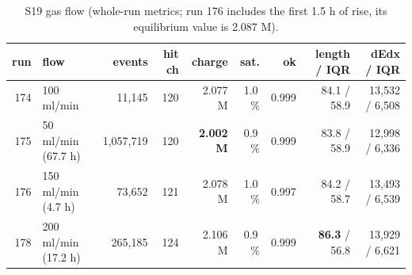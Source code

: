\documentclass[a4paper,11pt]{article}
\begin{document}
\begin{table}[H]\centering\small
\caption{S19 gas flow (whole-run metrics; run 176 includes the first 1.5 h of rise, its equilibrium value is 2.087 M).}
\begin{tabular}{rlrrrrrrr}
\toprule
run & flow & events & hit ch & charge & sat. & ok & length / IQR & dEdx / IQR \\
\midrule
174 & 100 ml/min & 11,145 & 120 & 2.077 M & 1.0\,\% & 0.999 & 84.1 / 58.9 & 13,532 / 6,508 \\
175 & 50 ml/min (67.7 h) & 1,057,719 & 120 & \textbf{2.002 M} & 0.9\,\% & 0.999 & 83.8 / 58.9 & 12,998 / 6,336 \\
176 & 150 ml/min (4.7 h) & 73,652 & 121 & 2.078 M & 1.0\,\% & 0.997 & 84.2 / 58.7 & 13,493 / 6,539 \\
178 & 200 ml/min (17.2 h) & 265,185 & 124 & 2.106 M & 0.9\,\% & 0.999 & \textbf{86.3} / 56.8 & 13,929 / 6,621 \\
\bottomrule
\end{tabular}
\end{table}
\end{document}
